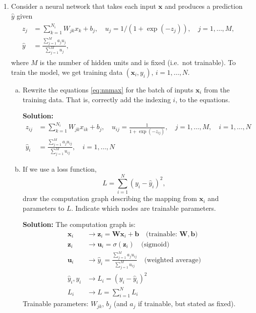 \documentclass[11pt]{article}
\newcommand{\bbf}{\mathbf{b}}
\newcommand{\ubf}{\mathbf{u}}
\newcommand{\xbf}{\mathbf{x}}
\newcommand{\zbf}{\mathbf{z}}
\newcommand{\Wbf}{\mathbf{W}}
\begin{document}
\begin{enumerate}
\pagebreak
\item \label{prob:cg_exp}
Consider a neural network that takes each input $\xbf$ and produces
a prediction $\hat{y}$ given
\begin{align} \label{eq:nnmax}
\begin{split}
    z_j  &= \sum_{k=1}^{N_i}W_{jk}x_k + b_j, \quad u_j = 1/(1+\exp(-z_j)),
    \quad j = 1,\ldots,M,\\
    \hat{y} &= \frac{ \sum_{j=1}^{M} a_j u_j}{ \sum_{j=1}^M u_j},
\end{split}
\end{align}
where $M$ is the number of hidden units and is fixed (i.e.\ not trainable).
To train the model, we get training data $(\xbf_i,y_i)$, $i=1,\ldots,N$.
\begin{enumerate}[(a)]
\item Rewrite the equations \eqref{eq:nnmax} for the
batch of inputs $\xbf_i$ from the training data.  That is, correctly
add the indexing $i$, to the equations.

\textbf{Solution:}
\begin{align}
z_{ij} &= \sum_{k=1}^{N_i} W_{jk} x_{ik} + b_j, \quad u_{ij} = \frac{1}{1+\exp(-z_{ij})}, \quad j = 1,\ldots,M, \quad i = 1,\ldots,N \\
\hat{y}_i &= \frac{\sum_{j=1}^{M} a_j u_{ij}}{\sum_{j=1}^M u_{ij}}, \quad i = 1,\ldots,N
\end{align}

\item If we use a loss function,
\[
    L = \sum_{i=1}^N (y_i - \hat{y}_i)^2,
\]
draw the computation graph describing the mapping from $\xbf_i$ and parameters
to $L$.
Indicate which nodes are trainable parameters.

\textbf{Solution:}
The computation graph is:
\begin{align*}
\xbf_i &\rightarrow \zbf_i = \Wbf \xbf_i + \bbf \quad \text{(trainable: } \Wbf, \bbf \text{)} \\
\zbf_i &\rightarrow \ubf_i = \sigma(\zbf_i) \quad \text{(sigmoid)} \\
\ubf_i &\rightarrow \hat{y}_i = \frac{\sum_{j=1}^M a_j u_{ij}}{\sum_{j=1}^M u_{ij}} \quad \text{(weighted average)} \\
\hat{y}_i, y_i &\rightarrow L_i = (y_i - \hat{y}_i)^2 \\
L_i &\rightarrow L = \sum_{i=1}^N L_i
\end{align*}
Trainable parameters: $W_{jk}$, $b_j$ (and $a_j$ if trainable, but stated as fixed).


\end{enumerate}
\end{enumerate}
\end{document}
